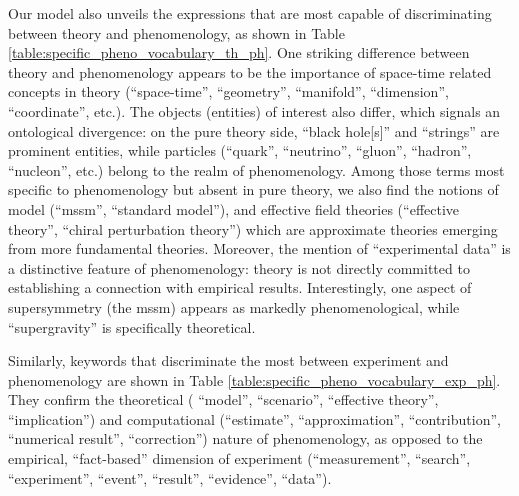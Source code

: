 \documentclass[smallextended]{svjour3}
\begin{document}
Our model also unveils the expressions that are most capable of discriminating between theory and phenomenology, as shown in Table \ref{table:specific_pheno_vocabulary_th_ph}. One striking difference between theory and phenomenology appears to be the importance of space-time related concepts in theory (``space-time'', ``geometry'',  ``manifold'', ``dimension'', ``coordinate'', etc.). The objects (entities) of interest also differ, which signals an ontological divergence: on the pure theory side, ``black hole[s]'' and ``strings'' are prominent entities, while particles (``quark'', ``neutrino'', ``gluon'', ``hadron'', ``nucleon'', etc.) belong to the realm of phenomenology. Among those terms most specific to phenomenology but absent in pure theory, we also  find the notions of model (``mssm'', ``standard model''), and effective field theories (``effective theory'', ``chiral perturbation theory'') which are approximate theories emerging from more fundamental theories. Moreover, the mention of ``experimental data'' is a distinctive feature of phenomenology: theory is not directly committed to establishing a connection with empirical results. Interestingly, one aspect of supersymmetry (the \gls{mssm}) appears as markedly phenomenological, while ``supergravity'' is specifically theoretical.


\setlength\extrarowheight{2pt}

Similarly, keywords that discriminate the most between experiment and phenomenology are shown in Table \ref{table:specific_pheno_vocabulary_exp_ph}. They confirm the theoretical ( ``model'', ``scenario'', ``effective theory'', ``implication'') and computational (``estimate'', ``approximation'',  ``contribution'', ``numerical result'', ``correction'') nature of phenomenology, as opposed to the empirical, ``fact-based'' dimension of experiment (``measurement'', ``search'', ``experiment'', ``event'', ``result'', ``evidence'', ``data'').

\setlength\extrarowheight{2pt}
\end{document}
